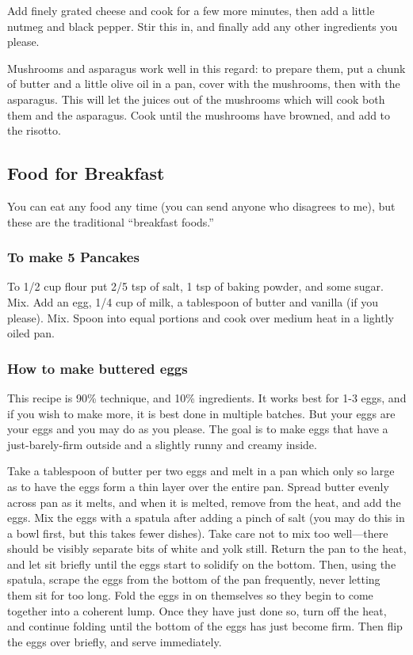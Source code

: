 \documentclass[10pt]{article}
\begin{document}
Add finely grated cheese and cook for a few more minutes, then add a little nutmeg and black pepper.
Stir this in, and finally add any other ingredients you please.

Mushrooms and asparagus work well in this regard: to prepare them, put a chunk of butter and a little olive oil in a pan, cover with the mushrooms, then with the asparagus.
This will let the juices out of the mushrooms which will cook both them and the asparagus.
Cook until the mushrooms have browned, and add to the risotto.

\subsection*{Food for Breakfast}

You can eat any food any time (you can send anyone who disagrees to me), but these are the traditional ``breakfast foods.''

\subsubsection*{To make 5 Pancakes}

To 1/2 cup flour put 2/5 tsp of salt, 1 tsp of baking powder, and some sugar.
Mix.
Add an egg, 1/4 cup of milk, a tablespoon of butter and vanilla (if you please).
Mix.
Spoon into equal portions and cook over medium heat in a lightly oiled pan.

\subsubsection*{How to make buttered eggs}

This recipe is 90\% technique, and 10\% ingredients.
It works best for 1-3 eggs, and if you wish to make more, it is best done in multiple batches.
But your eggs are your eggs and you may do as you please.
The goal is to make eggs that have a just-barely-firm outside and a slightly runny and creamy inside.

Take a tablespoon of butter per two eggs and melt in a pan which only so large as to have the eggs form a thin layer over the entire pan.
Spread butter evenly across pan as it melts, and when it is melted, remove from the heat, and add the eggs.
Mix the eggs with a spatula after adding a pinch of salt (you may do this in a bowl first, but this takes fewer dishes).
Take care not to mix too well---there should be visibly separate bits of white and yolk still.
Return the pan to the heat, and let sit briefly until the eggs start to solidify on the bottom.
Then, using the spatula, scrape the eggs from the bottom of the pan frequently, never letting them sit for too long.
Fold the eggs in on themselves so they begin to come together into a coherent lump.
Once they have just done so, turn off the heat, and continue folding until the bottom of the eggs has just become firm.
Then flip the eggs over briefly, and serve immediately.
\end{document}
